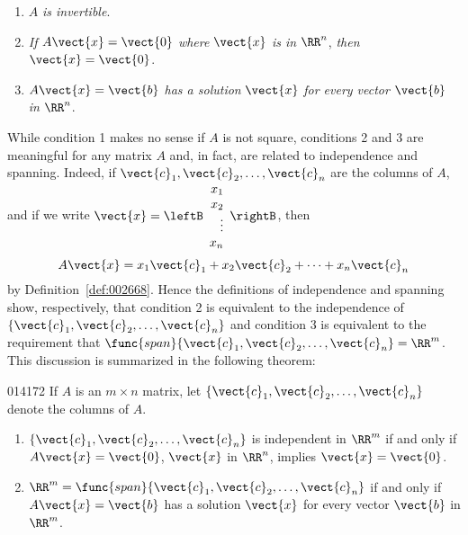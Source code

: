 \begin{enumerate}
\item $A$ \textit{is invertible}.

\item \textit{If} $A\vect{x} = \vect{0}$ \textit{where} $\vect{x}$ \textit{is in} $\RR^n$, \textit{then} $\vect{x} = \vect{0}$.

\item $A\vect{x} = \vect{b}$ \textit{has a solution} $\vect{x}$ \textit{for every vector} $\vect{b}$ \textit{in} $\RR^n$.

\end{enumerate}
While condition 1 makes no sense if $A$ is not square, conditions 2 and 3 are meaningful for any matrix $A$ and, in fact, are related to independence and spanning. Indeed, if $\vect{c}_{1}, \vect{c}_{2}, \dots, \vect{c}_{n}$ are the columns of $A$, and if we write 
$\vect{x} = 
\leftB \begin{array}{r}
x_1 \\
x_2 \\
\vdots \\
x_n
\end{array} \rightB$, then
\vspace*{-1em}
\begin{equation*}
A\vect{x} = x_1\vect{c}_1 + x_2\vect{c}_2 + \dots + x_n\vect{c}_n
\end{equation*}
by Definition~\ref{def:002668}. Hence the definitions of independence and spanning show, respectively, that condition 2 is equivalent to the independence of $\{\vect{c}_{1}, \vect{c}_{2}, \dots, \vect{c}_{n}\}$ and condition 3 is equivalent to the requirement that $\func{span}\{\vect{c}_{1}, \vect{c}_{2}, \dots, \vect{c}_{n}\} = \RR^m$. This discussion is summarized in the following theorem:

\begin{theorem}{}{014172} %
If $A$ is an $m \times n$ matrix, let $\{\vect{c}_{1}, \vect{c}_{2}, \dots, \vect{c}_{n}\}$ denote the columns of $A$.

\begin{enumerate}
\item $\{\vect{c}_{1}, \vect{c}_{2}, \dots, \vect{c}_{n}\}$ is independent in $\RR^m$ if and only if $A\vect{x} = \vect{0}$, $\vect{x}$ in $\RR^n$, implies $\vect{x} = \vect{0}$.

\item $\RR^m = \func{span}\{\vect{c}_{1}, \vect{c}_{2}, \dots, \vect{c}_{n}\}$ if and only if $A\vect{x} = \vect{b}$ has a solution $\vect{x}$ for every vector $\vect{b}$ in $\RR^m$.

\end{enumerate}
\end{theorem}

